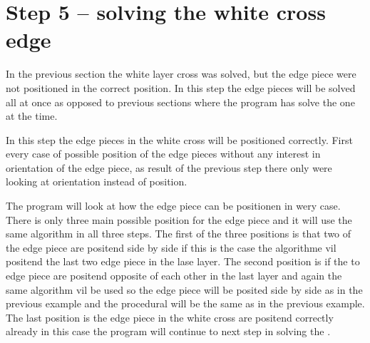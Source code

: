 \section{Step 5 -- solving the white cross edge}
In the previous section the white layer cross was solved, but the edge piece were not positioned in the correct position. In this step the edge pieces will be solved all at once as opposed to previous sections where the program has solve the \cpiece{} one at the time. 

In this step the edge pieces in the white cross will be positioned correctly. First every case of possible position of the edge pieces without any interest in orientation of the edge piece, as result of the previous step there only were looking at orientation instead of position. 

The program will look at how the edge piece can be positionen in wery case. There is only three main possible position for the edge piece and it will use the same algorithm in all three steps. 
The first of the three positions is that two of the edge piece are positend side by side if this is the case the algorithme vil positend the last two edge piece in the lase layer. 
The second position is if the to edge piece are positend opposite of each other in the last layer and again the same algorithm vil be used so the edge piece will be posited side by side as in the previous example and the procedural will be the same as in the previous example. 
The last position is the edge piece in the white cross are positend correctly already in this case the program will continue to next step in solving the \rubik{}.

